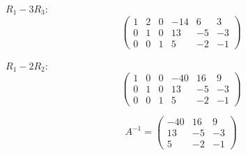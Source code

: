 $R_1 - 3R_3$:
\[
	\left(\begin{array}{ccc|ccc}
			1 & 2 & 0 & -14 & 6  & 3  \\
			0 & 1 & 0 & 13  & -5 & -3 \\
			0 & 0 & 1 & 5   & -2 & -1
		\end{array}\right)
\]

$R_1 - 2R_2$:
\[
	\left(\begin{array}{ccc|ccc}
			1 & 0 & 0 & -40 & 16 & 9  \\
			0 & 1 & 0 & 13  & -5 & -3 \\
			0 & 0 & 1 & 5   & -2 & -1
		\end{array}\right)
\]

\[
	A^{-1} = \begin{pmatrix}
		-40 & 16 & 9  \\
		13  & -5 & -3 \\
		5   & -2 & -1
	\end{pmatrix}
\]
